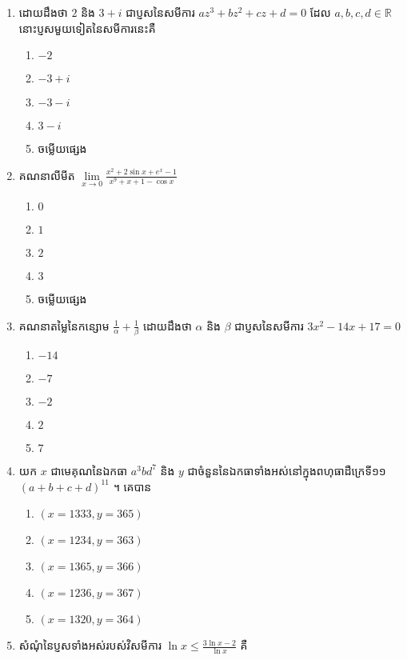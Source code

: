 \documentclass[12pt, a4paper]{article}
\begin{document}
\begin{enumerate}[m]
	\item ដោយដឹងថា $2$ និង $3+i$ ជាប្ញសនៃសមីការ $az^3+bz^2+cz+d=0 $ ដែល $a,b,c,d\in\mathbb{R}$ នោះប្ញសមួយទៀតនៃសមីការនេះគឺ
	\begin{enumerate}[k,5]
		\item $-2$
		\item $-3+i$
		\item $-3-i$
		\item $3-i$
		\item ចម្លើយផ្សេង
	\end{enumerate}
	{\color{blue}\hrulefill}
	\item គណនាលីមីត $\lim\limits_{x\to0}\frac{x^2+2\sin x+e^x-1}{x^9+x+1-\cos x}$
	\begin{enumerate}[k,5]
		\item $0$
		\item $1$
		\item $2$
		\item $3$
		\item ចម្លើយផ្សេង
	\end{enumerate}
	{\color{blue}\hrulefill}
	\item គណនាតម្លៃនៃកន្សោម $\frac{1}{\alpha}+\frac{1}{\beta}$ ដោយដឹងថា $\alpha$ និង $\beta$ ជាប្ញសនៃសមីការ $3x^2-14x+17=0$ 
	\begin{enumerate}[k,5]
		\item $-14$
		\item $-7$
		\item $-2$
		\item $2$
		\item $7$
	\end{enumerate}
	{\color{blue}\hrulefill}
	\item យក $x$ ជាមេគុណនៃឯកធា $a^3bd^7$ និង $y$ ជាចំនួននៃឯកធាទាំងអស់នៅក្នុងពហុធាដឺក្រេទី១១ $\left(a+b+c+d\right)^{11}$ ។ គេបាន
	\begin{enumerate}[k,3]
		\item $\left(x=1333,y=365\right)$
		\item $\left(x=1234,y=363\right)$
		\item $\left(x=1365,y=366\right)$
		\item $\left(x=1236,y=367\right)$
		\item $\left(x=1320,y=364\right)$
	\end{enumerate}
	{\color{blue}\hrulefill}
	\item សំណុំនៃប្ញសទាំងអស់របស់វិសមីការ $\ln x\leq\frac{3\ln x-2}{\ln x}$ គឺ
	\begin{enumerate}[k,3]

\end{enumerate}
\end{enumerate}
\end{document}
